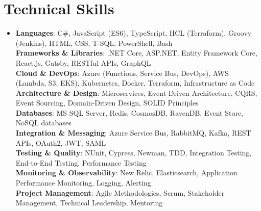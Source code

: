 \documentclass[letterpaper,11pt]{article}
\newcommand{\resumeItem}[1]{
  \item\small{
    {#1 \vspace{-1pt}}
  }
}
\newcommand{\resumeSubHeadingListStart}{\begin{itemize}[leftmargin=0.15in, label={}]}
\newcommand{\resumeSubHeadingListEnd}{\end{itemize}}
\begin{document}
\section{Technical Skills}
\resumeSubHeadingListStart
\resumeItem{
  \textbf{Languages}{: C\#, JavaScript (ES6), TypeScript, HCL (Terraform), Groovy (Jenkins), HTML, CSS, T-SQL, PowerShell, Bash} \\[1mm]
  \textbf{Frameworks \& Libraries}{: .NET Core, ASP.NET, Entity Framework Core, React.js, Gatsby, RESTful APIs, GraphQL} \\[1mm]
  \textbf{Cloud \& DevOps}{: Azure (Functions, Service Bus, DevOps), AWS (Lambda, S3, EKS), Kubernetes, Docker, Terraform, Infrastructure as Code} \\[1mm]
  \textbf{Architecture \& Design}{: Microservices, Event-Driven Architecture, CQRS, Event Sourcing, Domain-Driven Design, SOLID Principles} \\[1mm]
  \textbf{Databases}{: MS SQL Server, Redis, CosmosDB, RavenDB, Event Store, NoSQL databases} \\[1mm]
  \textbf{Integration \& Messaging}{: Azure Service Bus, RabbitMQ, Kafka, REST APIs, OAuth2, JWT, SAML} \\[1mm]
  \textbf{Testing \& Quality}{: NUnit, Cypress, Newman, TDD, Integration Testing, End-to-End Testing, Performance Testing} \\[1mm]
  \textbf{Monitoring \& Observability}{: New Relic, Elasticsearch, Application Performance Monitoring, Logging, Alerting} \\[1mm]
  \textbf{Project Management}{: Agile Methodologies, Scrum, Stakeholder Management, Technical Leadership, Mentoring}\\[1mm]
}
\resumeSubHeadingListEnd

\end{document}

